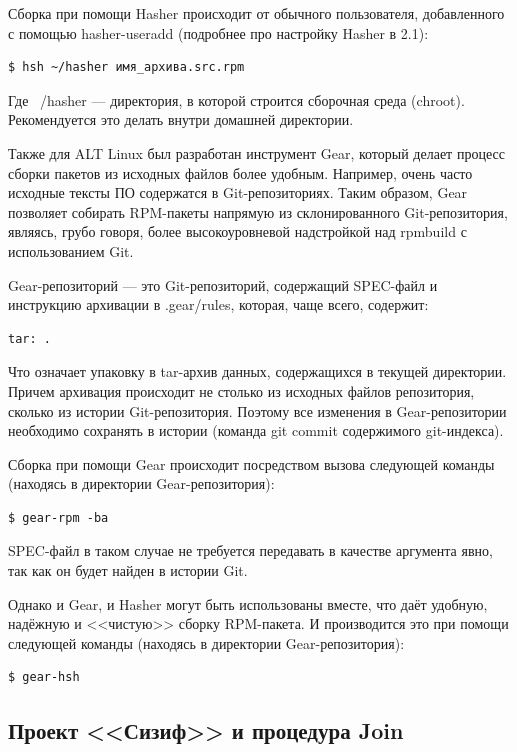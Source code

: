 \documentclass[bachelor, och, pract]{SCWorks}
\begin{document}
Сборка при помощи Hasher происходит от обычного пользователя, добавленного с помощью hasher-useradd (подробнее про настройку Hasher в 2.1):

\begin{Verbatim}
$ hsh ~/hasher имя_архива.src.rpm
\end{Verbatim}

Где ~/hasher --- директория, в которой строится сборочная среда (chroot). Рекомендуется это делать внутри домашней директории\cite{a_hasher}.

Также для ALT Linux был разработан инструмент Gear, который делает процесс сборки пакетов из исходных файлов более удобным. 
Например, очень часто исходные тексты ПО содержатся в Git-репозиториях.
Таким образом, Gear позволяет собирать RPM-пакеты напрямую из склонированного Git-репозитория, являясь, грубо говоря, более высокоуровневой надстройкой над rpmbuild с использованием Git.

Gear-репозиторий --- это Git-репозиторий, содержащий SPEC-файл и инструкцию архивации в .gear/rules, которая, чаще всего, содержит:
\begin{Verbatim}
tar: .
\end{Verbatim}

Что означает упаковку в tar-архив данных, содержащихся в текущей директории.
Причем архивация происходит не столько из исходных файлов репозитория, сколько из истории Git-репозитория. 
Поэтому все изменения в Gear-репозитории необходимо сохранять в истории (команда git commit содержимого git-индекса).

Сборка при помощи Gear происходит посредством вызова следующей команды (находясь в директории Gear-репозитория):
\begin{Verbatim}
$ gear-rpm -ba
\end{Verbatim}

SPEC-файл в таком случае не требуется передавать в качестве аргумента явно, так как он будет найден в истории Git\cite{a_gear}.

Однако и Gear, и Hasher могут быть использованы вместе, что даёт удобную, надёжную и <<чистую>> сборку RPM-пакета.
И производится это при помощи следующей команды (находясь в директории Gear-репозитория):

\begin{Verbatim}
$ gear-hsh
\end{Verbatim}

\subsection{Проект <<Сизиф>> и процедура Join}
\end{document}
